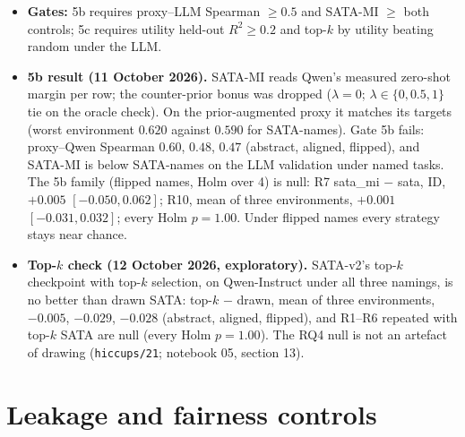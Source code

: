\documentclass[11pt,a4paper]{article}
\newcommand{\1}{\mathbf{1}}
\theoremstyle{plain}
\theoremstyle{definition}
\theoremstyle{remark}
\newcommand{\status}[1]{\par\noindent\hfill\fcolorbox{black!35}{black!4}{\scriptsize\sffamily Status: #1}\par\medskip}
\begin{document}
\begin{itemize}[nosep]
        SATA flattens the three environments, like counter\_spurious. On
        Qwen2.5-7B base (exploratory) it has the best worst-environment AUROC
        under both namings ($0.589$ abstract, $0.551$ flipped), with spurious
        reversal $+0.085$ and $+0.094$ over random at no ID cost.
  \item \textbf{Gates:} 5b requires proxy--LLM Spearman $\geq 0.5$ and
        SATA-MI $\geq$ both controls; 5c requires utility held-out
        $R^2 \geq 0.2$ and top-$k$ by utility beating random under the LLM.
  \item \textbf{5b result (11 October 2026).} SATA-MI reads Qwen's measured
        zero-shot margin per row; the counter-prior bonus was dropped
        ($\lambda = 0$; $\lambda \in \{0, 0.5, 1\}$ tie on the oracle check).
        On the prior-augmented proxy it matches its targets (worst environment
        $0.620$ against $0.590$ for SATA-names). Gate 5b fails: proxy--Qwen
        Spearman $0.60$, $0.48$, $0.47$ (abstract, aligned, flipped), and
        SATA-MI is below SATA-names on the LLM validation under named tasks.
        The 5b family (flipped names, Holm over 4) is null: R7 sata\_mi $-$
        sata, ID, $+0.005$ $[-0.050, 0.062]$; R10, mean of three environments,
        $+0.001$ $[-0.031, 0.032]$; every Holm $p = 1.00$. Under flipped names
        every strategy stays near chance.
  \item \textbf{Top-$k$ check (12 October 2026, exploratory).} SATA-v2's
        top-$k$ checkpoint with top-$k$ selection, on Qwen-Instruct under all
        three namings, is no better than drawn SATA: top-$k$ $-$ drawn, mean of
        three environments, $-0.005$, $-0.029$, $-0.028$ (abstract, aligned,
        flipped), and R1--R6 repeated with top-$k$ SATA are null (every Holm
        $p = 1.00$). The RQ4 null is not an artefact of drawing
        (\texttt{hiccups/21}; notebook 05, section 13).
\end{itemize}

\section{Leakage and fairness controls}
\label{sec:sata-controls}
\status{Planned (P5)}
\end{document}
